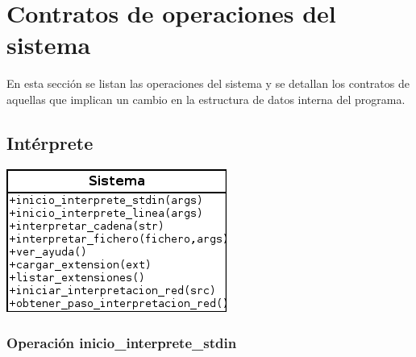 \section{Contratos de operaciones del sistema}
En esta sección se listan las operaciones del sistema y se detallan los contratos de aquellas
que implican un cambio en la estructura de datos interna del programa. 

\subsection{Intérprete}
\begin{center}
\includegraphics[scale=0.7]{operaciones_sistema.png} \\
\end{center}
\subsubsection{Operación inicio\_interprete\_stdin}

